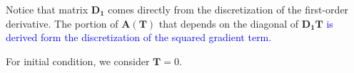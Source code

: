 Notice that matrix $\mathbf{D_1}$ comes directly from the discretization of the first-order derivative.
%
The portion of $\mathbf{A}(\mathbf{T})$ that depends on the diagonal of $\mathbf{D_1}\mathbf{T}$ \textcolor{blue}{is derived form the discretization of the squared gradient term.}

For initial condition, we consider $\mathbf{T} = 0$.













